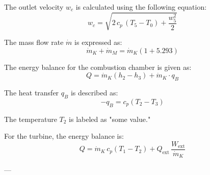 The outlet velocity \( w_c \) is calculated using the following equation:  
\[
w_c = \sqrt{2 \, c_p \, (T_5 - T_0) + \frac{w_5^2}{2}}
\]

The mass flow rate \( \dot{m} \) is expressed as:  
\[
\dot{m}_K + \dot{m}_M = \dot{m}_K (1 + 5.293)
\]

The energy balance for the combustion chamber is given as:  
\[
Q = \dot{m}_K (h_2 - h_3) + \dot{m}_K \cdot q_B
\]

The heat transfer \( q_B \) is described as:  
\[
-q_B = c_p (T_2 - T_3)
\]

The temperature \( T_2 \) is labeled as "some value."

For the turbine, the energy balance is:  
\[
Q = \dot{m}_K \, c_p (T_1 - T_2) + Q_{\text{ext}} \, \frac{W_{\text{ext}}}{\dot{m}_K}
\]

---